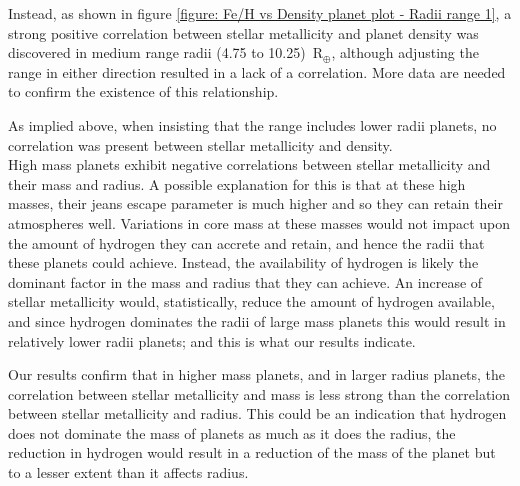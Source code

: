 \documentclass[a4paper,twocolumn,12pt]{article}
\begin{document}
Instead, as shown in figure \ref{figure: Fe/H vs Density planet plot - Radii range 1}, a strong positive correlation between stellar metallicity and planet density was discovered in medium range radii (4.75 to 10.25)~R$_\oplus$, although adjusting the range in either direction resulted in a lack of a correlation. More data are needed to confirm the existence of this relationship. %

As implied above, when insisting that the range includes lower radii planets, no correlation was present between stellar metallicity and density.\\
% 
% 
% 
% 

% 
% 
% 

High mass planets exhibit negative correlations between stellar metallicity and their mass and radius. A possible explanation for this is that at these high masses, their jeans escape parameter is much higher and so they can retain their atmospheres well. Variations in core mass at these masses would not impact upon the amount of hydrogen they can accrete and retain, and hence the radii that these planets could achieve. Instead, the availability of hydrogen is likely the dominant factor in the mass and radius that they can achieve. An increase of stellar metallicity would, statistically, reduce the amount of hydrogen available, and since hydrogen dominates the radii of large mass planets this would result in relatively lower radii planets; and this is what our results indicate.


Our results confirm that in higher mass planets, and in larger radius planets, the correlation between stellar metallicity and mass is less strong than the correlation between stellar metallicity and radius. This could be an indication that hydrogen does not dominate the mass of planets as much as it does the radius, the reduction in hydrogen would result in a reduction of the mass of the planet but to a lesser extent than it affects radius.\\
\end{document}
